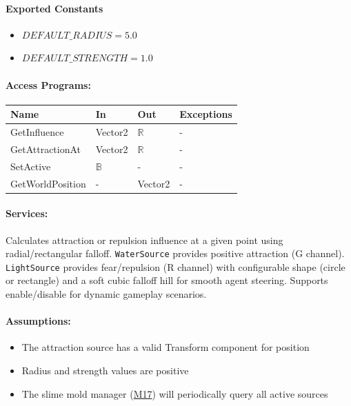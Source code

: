 \documentclass[12pt, titlepage]{article}
\begin{document}
\paragraph{Exported Constants}
\begin{itemize}
\item $DEFAULT\_RADIUS = 5.0$
\item $DEFAULT\_STRENGTH = 1.0$
\end{itemize}

\paragraph{Access Programs:}

\begin{center}
\begin{tabular}{p{35mm}p{2cm}p{2cm}p{22mm}}
\toprule
\textbf{Name} & \textbf{In} & \textbf{Out} & \textbf{Exceptions} \\
\midrule
GetInfluence & Vector2 & $\mathbb{R}$ & - \\
GetAttractionAt & Vector2 & $\mathbb{R}$ & - \\
SetActive & $\mathbb{B}$ & - & - \\
GetWorldPosition & - & Vector2 & - \\
\bottomrule
\end{tabular}
\end{center}

\paragraph{Services:}
Calculates attraction or repulsion influence at a given point using radial/rectangular
falloff. \texttt{WaterSource} provides positive attraction (G channel).
\texttt{LightSource} provides fear/repulsion (R channel) with configurable shape (circle or
rectangle) and a soft cubic falloff hill for smooth agent steering. Supports enable/disable
for dynamic gameplay scenarios.

\paragraph{Assumptions:}
\begin{itemize}
\item The attraction source has a valid Transform component for position
\item Radius and strength values are positive
\item The slime mold manager (\hyperref[M17]{M17}) will periodically query all active sources
\end{itemize}
\end{document}
